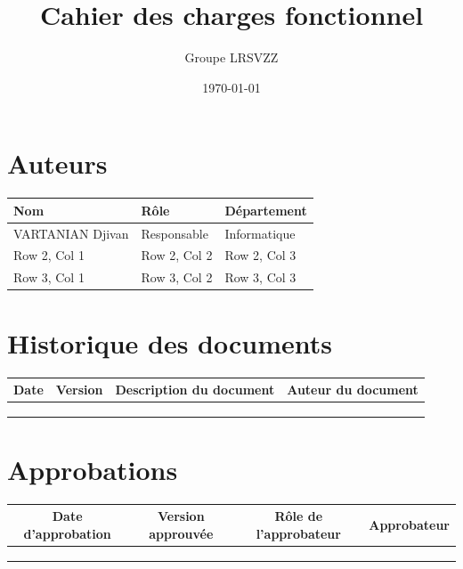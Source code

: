 \documentclass[a4paper,12pt]{report}  %
\title{Cahier des charges fonctionnel}
\author{Groupe LRSVZZ}
\date{\today}
\begin{document}
	
	\maketitle
	
	
	\section*{Auteurs}
	
	\renewcommand{\arraystretch}{1.5}  %
	\begin{table}[h]
		\begin{tabularx}{\textwidth}{|X|X|X|}  %
			\hline
			\textbf{Nom} & \textbf{Rôle} & \textbf{Département} \\
			\hline
			VARTANIAN Djivan & Responsable & Informatique \\
			\hline
			Row 2, Col 1 & Row 2, Col 2 & Row 2, Col 3 \\
			\hline
			Row 3, Col 1 & Row 3, Col 2 & Row 3, Col 3 \\
			\hline
		\end{tabularx}
	\end{table}
	
	\section*{Historique des documents}
	\begin{table}[h]
		\begin{tabular}{|c|c|c|c|} 
			\hline
			\textbf{Date} & \textbf{Version} & \textbf{Description du document} & \textbf{Auteur du document} \\
			\hline
			& & & \\
			\hline
			& & & \\
			\hline
			& & & \\
			\hline
		\end{tabular}
	\end{table}
	
	\section*{Approbations}
	\begin{table}[h]
		\begin{tabular}{|c|c|c|c|} 
			\hline
			\textbf{Date d'approbation} & \textbf{Version approuvée} & \textbf{Rôle de l'approbateur} & \textbf{Approbateur} \\
			\hline
			& & & \\
			\hline
			& & & \\
			\hline
			& & & \\
			\hline
		\end{tabular}
	\end{table}
	
\end{document}
